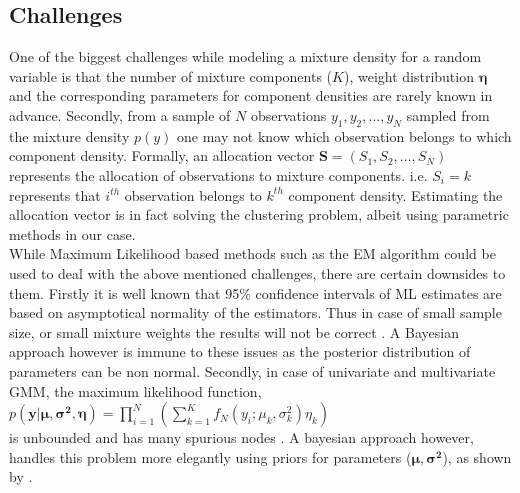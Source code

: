 \subsection{Challenges}
\label{subsec : challenges_mixture_density}
One of the biggest challenges while modeling a mixture density for a random variable is that the number of mixture components ($K$), weight distribution $\boldsymbol{\eta}$ and the corresponding parameters for component densities are rarely known in advance. Secondly, from a sample of $N$ observations $y_1, y_2, \ldots, y_N$ sampled from the mixture density $p(y)$ one may not know which observation belongs to which component density. Formally, an allocation vector $\boldsymbol{S} = (S_1, S_2, \ldots, S_N)$ represents the allocation of observations to mixture components. i.e. $S_i = k$ represents that $i^{th}$ observation belongs to $k^{th}$ component density. Estimating the allocation vector is in fact solving the clustering problem, albeit using parametric methods in our case.\\

While Maximum Likelihood based methods such as the EM algorithm could be used to deal with the above mentioned challenges, there are certain downsides to them. Firstly it is well known that 95\% confidence intervals of ML estimates are based on asymptotical normality of the estimators. Thus in case of small sample size, or small mixture weights the results will not be correct \citep[pg. 35]{fruhwirth-schnatter_finite_2013}. A Bayesian approach however is immune to these issues as the posterior distribution of parameters can be non normal. Secondly, in case of univariate and multivariate GMM, the maximum likelihood function,\\

$ p(\boldsymbol{y|\mu, \sigma^2, \eta}) = \prod_{i=1}^{N} (\sum_{k=1}^{K} f_N(y_i; \mu_k, \sigma^2_k) \eta_k)$\\

is unbounded and has many spurious nodes \citep{kiefer_consistency_1956,day_estimating_1969}. A bayesian approach however, handles this problem more elegantly using priors for parameters ($\boldsymbol{\mu, \sigma^2}$), as shown by \cite[pg. 176]{fruhwirth-schnatter_finite_2013}.

